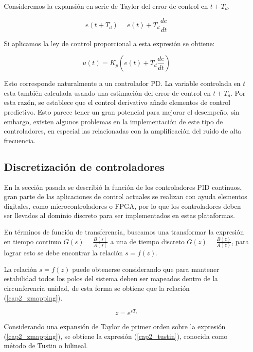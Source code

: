 Consideremos la expansión en serie de Taylor del error de control en $t + T_d$.

\begin{equation}
e(t + T_d) = e(t) + T_d \frac{de}{dt}
\end{equation}

Si aplicamos la ley de control proporcional a esta expresión se obtiene:

\begin{equation}
u(t) = K_p \left( e(t) + T_d \frac{de}{dt} \right)
\end{equation}

Esto corresponde naturalmente a un controlador PD. La variable controlada en $t$ esta también calculada usando una estimación del error de control en $t+T_d$. Por esta razón, se establece que el control derivativo añade elementos de control predictivo. Esto parece tener un gran potencial para mejorar el desempeño, sin embargo, existen algunos problemas en la implementación de este tipo de controladores, en especial las relacionadas con la amplificación del ruido de alta frecuencia.

\subsection{Discretización de controladores}

En la sección pasada se describió la función de los controladores PID continuos, gran parte de las aplicaciones de control actuales se realizan con ayuda elementos digitales, como microcontroladores o FPGA, por lo que los controladores deben ser llevados al dominio discreto para ser implementados en estas plataformas.

En términos de función de transferencia, buscamos una transformar la expresión en tiempo continuo $G(s)=\frac{B(s)}{A(s)}$ a una de tiempo discreto  $G(z)=\frac{B(z)}{A(z)}$, para lograr esto se debe encontrar la relación $s=f(z)$.

La relación $s=f(z)$ puede obtenerse considerando que para mantener estabilidad todos los polos del sistema deben ser mapeados dentro de la circunferencia unidad, de esta forma se obtiene que la relación (\ref{cap2_zmapping})\cite{oppenheim2009}.

\begin{equation}\label{cap2_zmapping}
z=e^{s T_s}
\end{equation}

Considerando una expansión de Taylor de primer orden sobre la expresión (\ref{cap2_zmapping}), se obtiene la expresión (\ref{cap2_tustin}), conocida como método de Tustin o bilineal.

